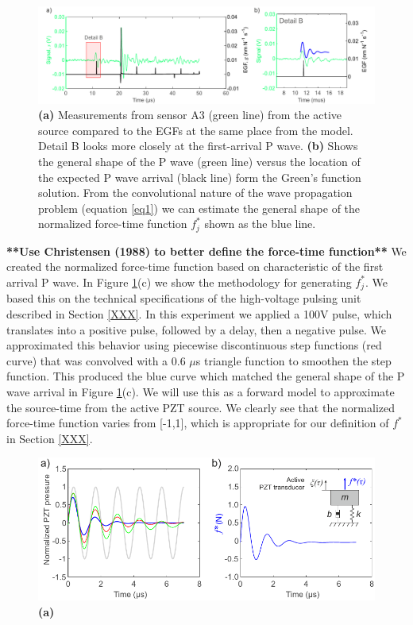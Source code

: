 \documentclass[preprint,3p, 11pt,authoryear]{elsarticle}
\begin{document}
\begin{figure}[ht]
     	\centering
\includegraphics[scale= 0.85]{FIG5.pdf} 
\caption{\textbf{(a)} Measurements from sensor A3 (green line) from the active source compared to the EGFs at the same place from the model.  Detail B looks more closely at the first-arrival P wave. \textbf{(b)} Shows the general shape of the P wave (green line) versus the location of the expected P wave arrival (black line) form the Green's function solution.  From the convolutional nature of the wave propagation problem (equation \eqref{eq1}) we can estimate the general shape of the normalized force-time function $f^{*}_{j}$ shown as the blue line.}
	\label{fig5} 
\end{figure}

\textbf{**Use Christensen (1988) to better define the force-time function**} We created the normalized force-time function based on characteristic of the first arrival P wave.  In Figure \ref{fig5}(c) we show the methodology for generating $f^{*}_{j}$.  We based this on the technical specifications of the high-voltage pulsing unit described in Section \ref{XXX}. In this experiment we applied a 100V pulse, which translates into a positive pulse, followed by a delay, then a negative pulse.  We approximated this behavior using piecewise discontinuous step functions (red curve) that was convolved with a 0.6 $\mu$s triangle function to smoothen the step function. This produced the blue curve which matched the general shape of the P wave arrival in Figure \ref{fig5}(c).  We will use this as a forward model to approximate the source-time from the active PZT source. We clearly see that the normalized force-time function varies from [-1,1], which is appropriate for our definition of $f^{*}$ in Section \ref{XXX}.

\begin{figure}[ht]
     	\centering
\includegraphics[scale= 0.9]{FIG5b.pdf} 
\caption{\textbf{(a)}  }
	\label{fig6} 
\end{figure}
\end{document}
